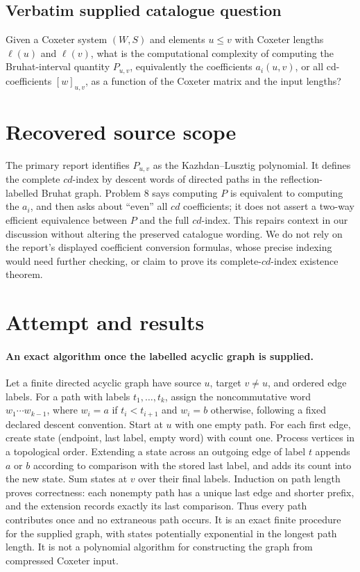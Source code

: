 \documentclass[11pt]{article}
\begin{document}
\subsection{Verbatim supplied catalogue question}
Given a Coxeter system $(W,S)$ and elements $u\leq v$ with Coxeter lengths $\ell(u)$ and $\ell(v)$, what is the computational complexity of computing the Bruhat-interval quantity $P_{u,v}$, equivalently the coefficients $a_i(u,v)$, or all cd-coefficients $[w]_{u,v}$, as a function of the Coxeter matrix and the input lengths?

\section{Recovered source scope}
The primary report identifies $P_{u,v}$ as the Kazhdan--Lusztig polynomial.
It defines the complete $cd$-index by descent words of directed paths in the
reflection-labelled Bruhat graph. Problem 8 says computing $P$ is equivalent
to computing the $a_i$, and then asks about ``even'' all $cd$ coefficients;
it does not assert a two-way efficient equivalence between $P$ and the full
$cd$-index. This repairs context in our discussion without altering the
preserved catalogue wording. We do not rely on the report's displayed
coefficient conversion formulas, whose precise indexing would need further
checking, or claim to prove its complete-$cd$-index existence theorem.

\section{Attempt and results}
\paragraph{An exact algorithm once the labelled acyclic graph is supplied.}
Let a finite directed acyclic graph have source $u$, target $v\ne u$, and
ordered edge labels. For a path with labels $t_1,\ldots,t_k$, assign the
noncommutative word $w_1\cdots w_{k-1}$, where $w_i=a$ if
$t_i<t_{i+1}$ and $w_i=b$ otherwise, following a fixed declared descent
convention. Start at $u$ with one empty path. For each first edge, create
state (endpoint, last label, empty word) with count one. Process vertices in
a topological order. Extending a state across an outgoing edge of label $t$
appends $a$ or $b$ according to comparison with the stored last label, and
adds its count into the new state. Sum states at $v$ over their final labels.
Induction on path length proves correctness: each nonempty path has a unique
last edge and shorter prefix, and the extension records exactly its last
comparison. Thus every path contributes once and no extraneous path occurs.
It is an exact finite procedure for the supplied graph, with states potentially
exponential in the longest path length. It is not a polynomial algorithm for
constructing the graph from compressed Coxeter input.
\end{document}
